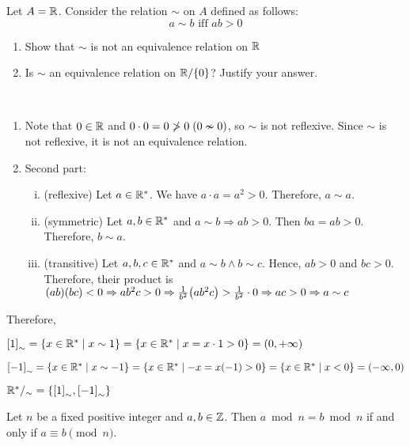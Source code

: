 \begin{exercise}
    Let $A = \mathbb{R}$. Consider the relation $\sim$ on $A$ defined as follows:
    \[ a \sim b \text{ iff } ab > 0 \]
    \begin{enumerate}
        \item Show that $\sim$ is not an equivalence relation on $\mathbb{R}$
        \item Is $\sim$ an equivalence relation on $\mathbb{R}/\qty{0}$? Justify your answer.
    \end{enumerate}
\end{exercise}

\begin{solution} \phantom{blank} \\
\begin{enumerate}
    \item Note that $0 \in \mathbb{R}$ and $0 \cdot 0 = 0 \ngtr 0 \; \qty(0 \nsim 0)$, so $\sim$ is not reflexive. Since $\sim$ is not reflexive, it is not an equivalence relation.
    \item Second part:
    
    \begin{enumerate}[i.]
        \item (reflexive) Let $a \in \mathbb{R}^*$. We have $a \cdot a = a^2 > 0$. Therefore, $a \sim a$.
        \item (symmetric) Let $a, b \in \mathbb{R}^*$ and $a \sim b \Rightarrow ab > 0$. Then $ba = ab > 0$. Therefore, $b \sim a$.
        \item (transitive) Let $a, b, c \in \mathbb{R}^*$ and $a \sim b \land b \sim c$. Hence, $ab > 0$ and $bc > 0$. Therefore, their product is $\qty(ab)\qty(bc) < 0 \Rightarrow ab^2c > 0 \Rightarrow \frac{1}{b^2} \qty(ab^2c) > \frac{1}{b^2} \cdot 0 \Rightarrow ac > 0 \Rightarrow a \sim c$ 
    \end{enumerate}
\end{enumerate}

    Therefore,
    
    $\qty[1]_{\sim} = \qty{x \in \mathbb{R}^* \mid x \sim 1} = \qty{x \in \mathbb{R}^* \mid x = x \cdot 1 > 0}  = \qty(0, +\infty)$
    
    $\qty[-1]_{\sim} = \qty{x \in \mathbb{R}^* \mid x \sim -1} = \qty{x \in \mathbb{R}^* \mid -x = x \qty(-1) > 0} = \qty{x \in \mathbb{R}^* \mid x < 0} = \qty(- \infty, 0) $
    
    $\mathbb{R}^*/_{\sim} = \qty{\qty[1]_{\sim}, \qty[-1]_{\sim}}$
\end{solution}


\begin{theorem}
    Let $n$ be a fixed positive integer and $a, b \in \mathbb{Z}$. Then $a \bmod{n} = b \bmod{n}$ if and only if $a \equiv b \pmod{n}$.
\end{theorem}